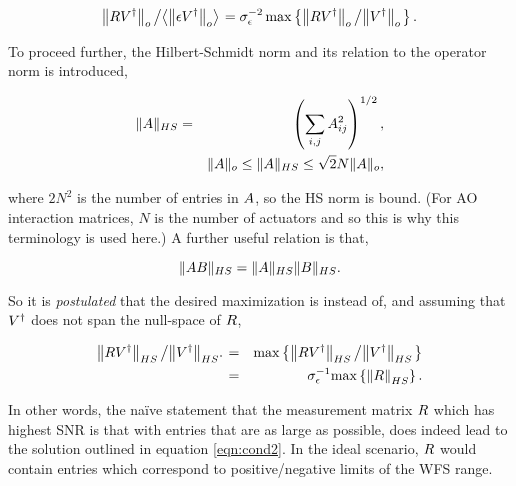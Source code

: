 \documentclass[a4paper]{article}
\begin{document}
\begin{equation*}
     {\left\|\mathnormal{R}\mathnormal{V}^{\dagger}\right\|_{o}}
     \left/
     {\left\langle
      \left\|\mathnormal{\epsilon}\mathnormal{V}^{\dagger}\right\|_{o}
      \right\rangle}
     \right.=
   \sigma_\epsilon^{-2}\,\mathrm{max}\left\{
     {\left\|\mathnormal{R}\mathnormal{V}^{\dagger}\right\|_{o}}
     \left/
     {\left\|\mathnormal{V}^{\dagger}\right\|_{o}}
     \right.
   \right\}.
\end{equation*}

To proceed further, the Hilbert-Schmidt norm and its relation to the operator
norm is introduced,

\begin{eqnarray*}
   \|\mathnormal{A}\|_{HS}&=& \left( \sum_{i,j} A_{ij}^2 \right)^{1/2},\\
   &&\|\mathnormal{A}\|_{o}\le\|\mathnormal{A}\|_{HS}\le\sqrt{2}N\|\mathnormal{A}\|_{o},\\
\end{eqnarray*}

where $2N^{2}$ is the number of entries in $\mathnormal{A}$, so the HS norm is
bound. (For AO interaction matrices, $N$ is the number of actuators and so this
is why this terminology is used here.) A further useful relation is that,

\begin{equation*}
   \|\mathnormal{A}\mathnormal{B}\|_{HS}=\|\mathnormal{A}\|_{HS}\|\mathnormal{B}\|_{HS}.
\end{equation*}

So it is {\it postulated} that the desired maximization is instead of, and
assuming that $\mathnormal{V}^{\dagger}$ does not span the null-space of
$\mathnormal{R}$,

\begin{eqnarray}
     {\left\|\mathnormal{R}\mathnormal{V}^{\dagger}\right\|_{HS}}
     \left/
     {\left\|\mathnormal{V}^{\dagger}\right\|_{HS}}.
     \right. &=&
   \mathrm{max}\left\{
     {\left\|\mathnormal{R}\mathnormal{V}^{\dagger}\right\|_{HS}}
     \left/
     {\left\|\mathnormal{V}^{\dagger}\right\|_{HS}}
     \right.
   \right\} \nonumber \\
     &=&
   \sigma_\epsilon^{-1}\mathrm{max}\left\{
     {\left\|\mathnormal{R}\right\|_{HS}} \right\} \label{eqn:cond2} .
\end{eqnarray}

In other words, the na\"{i}ve statement that the measurement matrix
$\mathnormal{R}$ which has highest SNR is that with entries that are as large as
possible, does indeed lead to the solution outlined in equation
\ref{eqn:cond2}. In the ideal scenario, $\mathnormal{R}$ would contain entries
which correspond to positive/negative limits of the WFS range.
\end{document}
